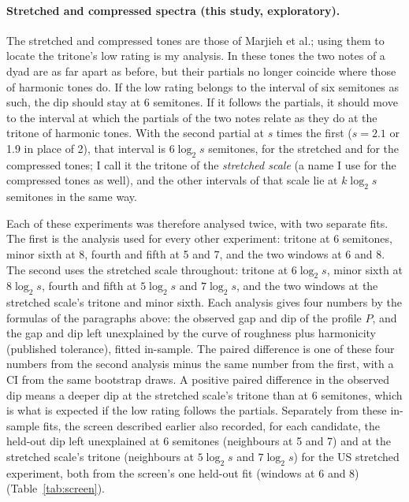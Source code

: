 \documentclass[11pt,a4paper]{article}
\begin{document}
\paragraph{Stretched and compressed spectra (this study, exploratory).}
The stretched and compressed tones are those of Marjieh et al.; using them to locate the
tritone's low rating is my analysis. In these tones the two notes of a dyad are as far apart
as before, but their partials no longer coincide where those of harmonic tones do. If the low
rating belongs to the interval of six semitones as such, the dip should stay at 6 semitones.
If it follows the partials, it should move to the interval at which the partials of the two
notes relate as they do at the tritone of harmonic tones. With the second partial at $s$
times the first ($s=2.1$ or 1.9 in place of 2), that interval is $6\log_2 s$ semitones,
\sscPosStr{} for the stretched and \sscPosComp{} for the compressed tones; I call it the
tritone of the \emph{stretched scale} (a name I use for the compressed tones as well), and the other intervals of that scale lie at
$k\log_2 s$ semitones in the same way.

Each of these experiments was therefore analysed twice, with two separate fits. The first is
the analysis used for every other experiment: tritone at 6 semitones, minor sixth at 8,
fourth and fifth at 5 and 7, and the two windows at 6 and 8. The second uses the stretched
scale throughout: tritone at $6\log_2 s$, minor sixth at $8\log_2 s$, fourth and fifth at
$5\log_2 s$ and $7\log_2 s$, and the two windows at the stretched scale's tritone and minor
sixth. Each analysis gives four numbers by the formulas of the paragraphs above: the
observed gap and dip of the profile $P$, and the gap and dip left unexplained by the curve of
roughness plus harmonicity (published tolerance), fitted in-sample. The paired difference is
one of these four numbers from the second analysis minus the same number from the first, with
a CI from the same bootstrap draws. A positive paired difference in the observed dip means a
deeper dip at the stretched scale's tritone than at 6 semitones, which is what is expected
if the low rating follows the partials. Separately from these in-sample fits, the screen described earlier also recorded, for each candidate, the
held-out dip left unexplained at 6 semitones (neighbours at 5 and 7) and at the stretched scale's tritone (neighbours at $5\log_2 s$ and $7\log_2 s$) for the US
stretched experiment, both from the screen's one held-out fit (windows at 6 and 8) (Table~\ref{tab:screen}).
\end{document}
